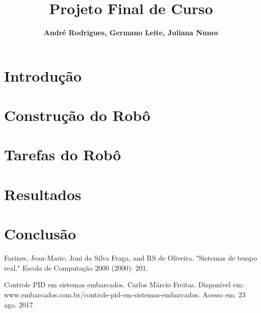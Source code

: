 \documentclass[10pt, a4paper]{article}
\author{
	\textbf{André Rodrigues, Germano Leite, Juliana Nunes}
}
\title{ \textbf{Projeto Final de Curso}}
\date{}
\begin{document}
\maketitle

\section{Introdução}
	\label{sec:introducao}
	

\section{Construção do Robô}
	\label{sec:trabRel}
	
    
    \section{Tarefas do Robô}
    \label{sec:workProp}
    

\section{Resultados}
	\label{sec:objetivos}
	

\section{Conclusão}
	\label{sec:materiais}
	
    

\newpage
\begin{thebibliography}{99}

    Farines, Jean-Marie, Joni da Silva Fraga, and RS de Oliveira. "Sistemas de tempo real." Escola de Computação 2000 (2000): 201.
    
Controle PID em sistemas embarcados. Carlos Márcio Freitas. Disponível em: www.embarcados.com.br/controle-pid-em-sistemas-embarcados. Acesso em: 23 ago. 2017.

    

\end{thebibliography}
\end{document}
